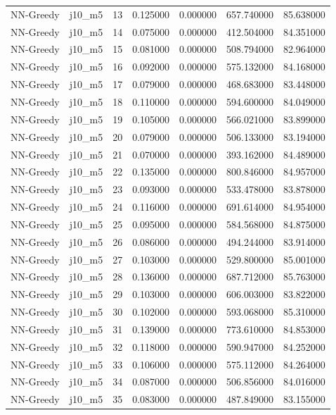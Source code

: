 \begin{tabular}{llrrrrr}
NN-Greedy & j10_m5 & 13 & 0.125000 & 0.000000 & 657.740000 & 85.638000 \\
NN-Greedy & j10_m5 & 14 & 0.075000 & 0.000000 & 412.504000 & 84.351000 \\
NN-Greedy & j10_m5 & 15 & 0.081000 & 0.000000 & 508.794000 & 82.964000 \\
NN-Greedy & j10_m5 & 16 & 0.092000 & 0.000000 & 575.132000 & 84.168000 \\
NN-Greedy & j10_m5 & 17 & 0.079000 & 0.000000 & 468.683000 & 83.448000 \\
NN-Greedy & j10_m5 & 18 & 0.110000 & 0.000000 & 594.600000 & 84.049000 \\
NN-Greedy & j10_m5 & 19 & 0.105000 & 0.000000 & 566.021000 & 83.899000 \\
NN-Greedy & j10_m5 & 20 & 0.079000 & 0.000000 & 506.133000 & 83.194000 \\
NN-Greedy & j10_m5 & 21 & 0.070000 & 0.000000 & 393.162000 & 84.489000 \\
NN-Greedy & j10_m5 & 22 & 0.135000 & 0.000000 & 800.846000 & 84.957000 \\
NN-Greedy & j10_m5 & 23 & 0.093000 & 0.000000 & 533.478000 & 83.878000 \\
NN-Greedy & j10_m5 & 24 & 0.116000 & 0.000000 & 691.614000 & 84.954000 \\
NN-Greedy & j10_m5 & 25 & 0.095000 & 0.000000 & 584.568000 & 84.875000 \\
NN-Greedy & j10_m5 & 26 & 0.086000 & 0.000000 & 494.244000 & 83.914000 \\
NN-Greedy & j10_m5 & 27 & 0.103000 & 0.000000 & 529.800000 & 85.001000 \\
NN-Greedy & j10_m5 & 28 & 0.136000 & 0.000000 & 687.712000 & 85.763000 \\
NN-Greedy & j10_m5 & 29 & 0.103000 & 0.000000 & 606.003000 & 83.822000 \\
NN-Greedy & j10_m5 & 30 & 0.102000 & 0.000000 & 593.068000 & 85.310000 \\
NN-Greedy & j10_m5 & 31 & 0.139000 & 0.000000 & 773.610000 & 84.853000 \\
NN-Greedy & j10_m5 & 32 & 0.118000 & 0.000000 & 590.947000 & 84.252000 \\
NN-Greedy & j10_m5 & 33 & 0.106000 & 0.000000 & 575.112000 & 84.264000 \\
NN-Greedy & j10_m5 & 34 & 0.087000 & 0.000000 & 506.856000 & 84.016000 \\
NN-Greedy & j10_m5 & 35 & 0.083000 & 0.000000 & 487.849000 & 83.155000 \\

\end{tabular}
